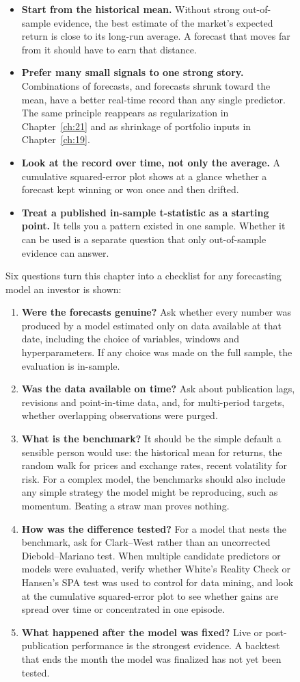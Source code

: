 \begin{figure}[htbp]
\begin{itemize}
  \item \textbf{Start from the historical mean.} Without strong out-of-sample evidence, the best estimate of the market's expected return is close to its long-run average. A forecast that moves far from it should have to earn that distance.
  \item \textbf{Prefer many small signals to one strong story.} Combinations of forecasts, and forecasts shrunk toward the mean, have a better real-time record than any single predictor. The same principle reappears as regularization in Chapter~\ref{ch:21} and as shrinkage of portfolio inputs in Chapter~\ref{ch:19}.
  \item \textbf{Look at the record over time, not only the average.} A cumulative squared-error plot shows at a glance whether a forecast kept winning or won once and then drifted.
  \item \textbf{Treat a published in-sample t-statistic as a starting point.} It tells you a pattern existed in one sample. Whether it can be used is a separate question that only out-of-sample evidence can answer.
\end{itemize}

Six questions turn this chapter into a checklist for any forecasting model an investor is shown:

\begin{enumerate}
  \item \textbf{Were the forecasts genuine?} Ask whether every number was produced by a model estimated only on data available at that date, including the choice of variables, windows and hyperparameters. If any choice was made on the full sample, the evaluation is in-sample.
  \item \textbf{Was the data available on time?} Ask about publication lags, revisions and point-in-time data, and, for multi-period targets, whether overlapping observations were purged.
  \item \textbf{What is the benchmark?} It should be the simple default a sensible person would use: the historical mean for returns, the random walk for prices and exchange rates, recent volatility for risk. For a complex model, the benchmarks should also include any simple strategy the model might be reproducing, such as momentum. Beating a straw man proves nothing.
  \item \textbf{How was the difference tested?} For a model that nests the benchmark, ask for Clark--West rather than an uncorrected Diebold--Mariano test. When multiple candidate predictors or models were evaluated, verify whether White's Reality Check or Hansen's SPA test was used to control for data mining, and look at the cumulative squared-error plot to see whether gains are spread over time or concentrated in one episode.
  \item \textbf{What happened after the model was fixed?} Live or post-publication performance is the strongest evidence. A backtest that ends the month the model was finalized has not yet been tested.
\end{enumerate}


\end{figure}
